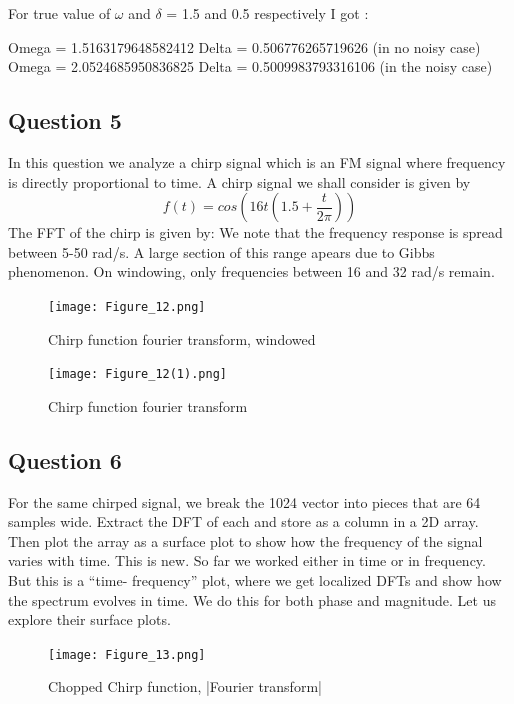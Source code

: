 \documentclass{article}
\begin{document}
For true value of $\omega$ and $\delta$ = 1.5 and 0.5 respectively 
I got :

Omega = 1.5163179648582412\newline
Delta = 0.506776265719626 (in no noisy case)\newline
Omega = 2.0524685950836825\newline
Delta = 0.5009983793316106 (in the noisy case)
\subsection{Question 5}
In this question we analyze a chirp signal which is an FM signal where frequency is directly proportional to time.
A chirp signal we shall consider is given by 
\begin{equation}
    f(t) = cos(16t(1.5 + \frac{t}{2\pi}))
\end{equation}
The FFT of the chirp is given by:
We note that the frequency response is spread between 5-50 rad/s. A large section of this range apears due to Gibbs phenomenon. On windowing, only frequencies between 16 and 32 rad/s remain.
\begin{figure}[h!]
\centering
\texttt{[image: Figure\_12.png]}
\caption{Chirp function fourier transform, windowed}
\label{fig:universe}
\end{figure}
\begin{figure}[h!]
\centering
\texttt{[image: Figure\_12(1).png]}
\caption{Chirp function fourier transform}
\label{fig:universe}
\end{figure}


\subsection{Question 6}
For the same chirped signal, we break the 1024 vector into pieces that are 64 samples wide.
Extract the DFT of each and store as a column in a 2D array. Then plot the array as a surface plot to show how the frequency of the signal varies with time.
This is new. So far we worked either in time or in frequency. But this is a “time- frequency” plot, where we get localized DFTs and show how the spectrum evolves in time.
We do this for both phase and magnitude. Let us explore their surface plots.

\begin{figure}[h!]
\centering
\texttt{[image: Figure\_13.png]}
\caption{Chopped Chirp function, |Fourier transform|}
\label{fig:universe}
\end{figure}
\end{document}
